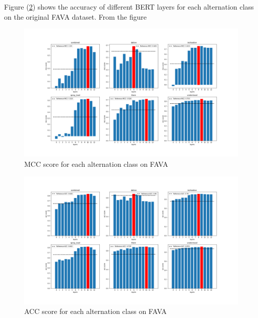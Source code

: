 \documentclass[11pt]{article}
\begin{document}
Figure (\ref{fava:acc}) shows the accuracy of different BERT layers for each alternation class on the original FAVA dataset. From the figure

 \begin{figure}[htbp]
  \centering
  \includegraphics[width=.5\textwidth]{paper/figures/mcc_fava.png} 
  \caption{MCC score for each alternation class on FAVA}
  \label{fava:mcc}
\end{figure}
 \begin{figure}[htbp]
  \centering
  \includegraphics[width=.5\textwidth]{paper/figures/acc_fava.png} 
  \caption{ACC score for each alternation class on FAVA}
  \label{fava:acc}
\end{figure}
\end{document}
